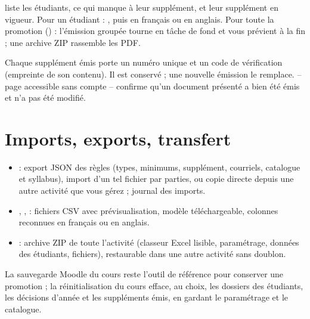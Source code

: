 \documentclass[11pt,a4paper]{article}
\begin{document}
 liste les étudiants, ce qui manque à leur
supplément, et leur supplément en vigueur. Pour un étudiant : , puis
 en français ou en anglais. Pour toute la promotion () : l'émission groupée tourne
en tâche de fond et vous prévient à la fin ; une archive ZIP rassemble les PDF.


Chaque supplément émis porte un numéro unique et un code de vérification (empreinte de son
contenu). Il est conservé ; une nouvelle émission le remplace. 
-- page accessible sans compte -- confirme qu'un document présenté a bien été émis et n'a pas
été modifié.

\section{Imports, exports, transfert}\label{sec:transfert}

\begin{itemize}
  \item {} : export JSON des règles (types, minimums,
    supplément, courriels, catalogue et syllabus), import d'un tel fichier par parties, ou copie
    directe depuis une autre activité que vous gérez ; journal des imports.
  \item {}, ,
     : fichiers CSV avec prévisualisation, modèle téléchargeable,
    colonnes reconnues en français ou en anglais.
  \item {} : archive ZIP de toute l'activité (classeur
    Excel lisible, paramétrage, données des étudiants, fichiers), restaurable dans une autre
    activité sans doublon.
\end{itemize}


La sauvegarde Moodle du cours reste l'outil de référence pour conserver une promotion ; la
réinitialisation du cours efface, au choix, les dossiers des étudiants, les décisions d'année
et les suppléments émis, en gardant le paramétrage et le catalogue.
\end{document}

